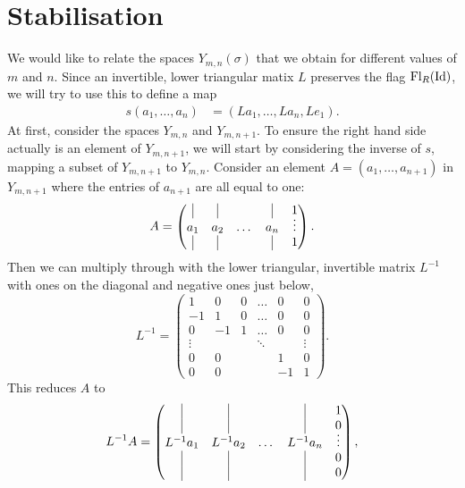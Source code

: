 \section{Stabilisation} 
\label{sec:rum-stabil}

We would like to relate the spaces $Y_{m,n}(\sigma)$ that we obtain
for different values of
$m$ and $n$. Since an invertible, lower triangular matix $L$ preserves
the flag $\mathrm{Fl}_R(\operatorname{Id})$, we will try to use this to define a map
\begin{align*}
  s(a_1,\dots,a_{n}) &= (La_1,\dots,La_{n},Le_1).
\end{align*}
At first, consider the spaces $Y_{m,n}$ and $Y_{m,n+1}$.
To ensure the right hand side actually is an element of $Y_{m,n+1}$,
we will start by considering the inverse of $s$, mapping a subset of
$Y_{m,n+1}$ to $Y_{m,n}$.
Consider an element $A=(a_1,\dots,a_{n+1})$ in $Y_{m,n+1}$ where
the entries of $a_{n+1}$ are all equal to one:
\[ A = 
\begin{pmatrix}
  \vrule & \vrule & & \vrule & \vspace{-0.5em}
  1 \\
  a_1 & a_2 & \dots & a_{n} & \vdots \\
  \vrule & \vrule & & \vrule & 1
\end{pmatrix}. \] 
Then we can multiply through with the lower triangular, invertible
matrix $L^{-1}$ with ones on the diagonal and negative ones just below,
\[ L^{-1} =
\begin{pmatrix}
  1 &  0 & 0 & \dots & 0 & 0 \\
  -1 &  1 & 0 & \dots & 0 &0 \\
  0 & -1 & 1 & \dots & 0 & 0 \\
  \vdots &  &  & \ddots & & \vdots \\
  0 & 0 & & & 1 & 0 \\
  0 & 0 & & & -1 & 1
\end{pmatrix}. \]
This reduces $A$ to
\[ L^{-1}A =
\begin{pmatrix}
  \vrule & \vrule & & \vrule & 
  1 \\
  \vrule & \vrule & & \vrule & \vspace{-0.5em}
  0 \\
  L^{-1}a_1 & L^{-1}a_2 & \dots & L^{-1}a_{n} & \vdots \\
  \vrule & \vrule & & \vrule & 0 \\
  \vrule & \vrule & & \vrule & 0
\end{pmatrix}, \]
